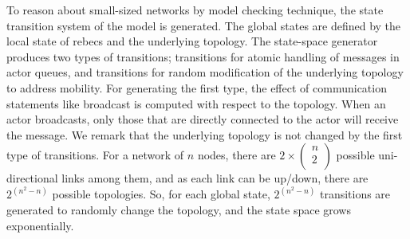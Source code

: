To reason about small-sized networks by model checking technique, the state transition system of the model is generated. The global states %
are defined by the local state of rebecs and the underlying topology. The state-space generator produces two types of transitions; transitions for atomic handling of messages in actor queues, and transitions for random modification of the underlying topology to address mobility. For generating the first type, the effect of communication statements like broadcast is computed with respect to the topology. When an actor broadcasts, only those that are directly connected to the actor will receive the message. We remark that the underlying topology is not changed by the first type of transitions.   %
For a network of $n$ nodes, there are $2\times \begin{pmatrix}
n \\
2 \\
\end{pmatrix}$ possible uni-directional links among them, and as each link can be up/down, there are $2^{(n^2-n)}$ possible topologies. %
So, for each global state, $2^{(n^2-n)}$ transitions are generated to randomly change the topology, and the state space grows exponentially. %

